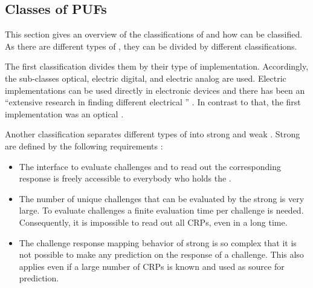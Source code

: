 

\subsection{Classes of PUFs}
\label{sec:classesofpufs}

This section gives an overview of the classifications of \pufs and how \apufs can be classified.
As there are different types of \pufs, they can be divided by different classifications. %

The first classification divides them by their type of implementation.
Accordingly, the sub-classes optical, electric digital, and electric analog are used.
Electric implementations can be used directly in electronic devices and there has been an ``extensive research in finding different electrical \pufs'' \cite{Becker2015ThePUFs}.
In contrast to that, the first \puf implementation was an optical \puf. %

Another classification separates different types of \pufs into strong and weak \pufs.
Strong \pufs are defined by the following requirements \cite{Ruhrmair2013PUFsEvaluations}:

\begin{itemize}
\item The interface to evaluate challenges and to read out the corresponding response is freely accessible to everybody who holds the \puf.
\item The number of unique challenges that can be evaluated by the strong \puf is very large.
To evaluate challenges a finite evaluation time per challenge is needed.
Consequently, it is impossible to read out all \acp{CRP}, even in a long time.
\item The challenge response mapping behavior of strong \pufs is so complex that it is not possible to make any prediction on the response of a challenge. 
This also applies even if a large number of \acp{CRP} is known and used as source for prediction.
\end{itemize}

